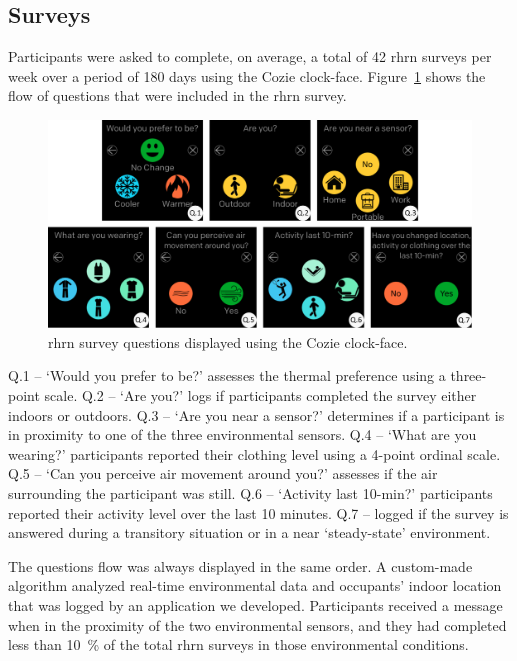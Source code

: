 \subsection{Surveys}\label{subsec:surveys}
Participants were asked to complete, on average, a total of 42 \ac{rhrn} surveys per week over a period of 180 days using the Cozie clock-face.
Figure~\ref{fig:cozie_flow} shows the flow of questions that were included in the \ac{rhrn} survey.

\begin{figure}[thb!]
    \centering
    \includegraphics[width=\textwidth]{figures/figure_2}
    \caption{\acf{rhrn} survey questions displayed using the Cozie clock-face.}
    \label{fig:cozie_flow}
\end{figure}

Q.1 -- `Would you prefer to be?' assesses the thermal preference using a three-point scale.
Q.2 -- `Are you?' logs if participants completed the survey either indoors or outdoors.
Q.3 -- `Are you near a sensor?' determines if a participant is in proximity to one of the three environmental sensors.
Q.4 -- `What are you wearing?' participants reported their clothing level using a 4-point ordinal scale.
Q.5 -- `Can you perceive air movement around you?' assesses if the air surrounding the participant was still.
Q.6 -- `Activity last 10-min?' participants reported their activity level over the last 10 minutes.
Q.7 -- logged if the survey is answered during a transitory situation or in a near `steady-state' environment.

The questions flow was always displayed in the same order.
A custom-made algorithm analyzed real-time environmental data and occupants' indoor location that was logged by an application we developed.
Participants received a message when in the proximity of the two environmental sensors, and they had completed less than 10~\% of the total \ac{rhrn} surveys in those environmental conditions.

